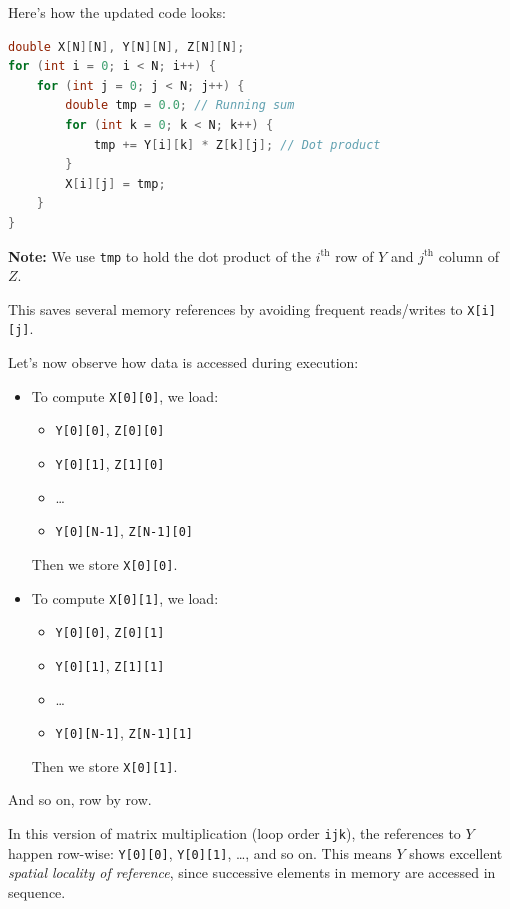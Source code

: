 \documentclass[12pt]{book}
\begin{document}
Here’s how the updated code looks:

\begin{lstlisting}[language=C++, caption={Optimized Matrix Multiplication using temporary variable}, label={lst:opt-matmul}]
double X[N][N], Y[N][N], Z[N][N];
for (int i = 0; i < N; i++) {
    for (int j = 0; j < N; j++) {
        double tmp = 0.0; // Running sum
        for (int k = 0; k < N; k++) {
            tmp += Y[i][k] * Z[k][j]; // Dot product
        }
        X[i][j] = tmp;
    }
}
\end{lstlisting}

\textbf{Note:} We use \texttt{tmp} to hold the dot product of the $i^{\text{th}}$ row of $Y$ and $j^{\text{th}}$ column of $Z$.

This saves several memory references by avoiding frequent reads/writes to \texttt{X[i][j]}.

Let’s now observe how data is accessed during execution:

\begin{itemize}
    \item To compute \texttt{X[0][0]}, we load:
    \begin{itemize}
        \item \texttt{Y[0][0]}, \texttt{Z[0][0]}
        \item \texttt{Y[0][1]}, \texttt{Z[1][0]}
        \item \dots
        \item \texttt{Y[0][N-1]}, \texttt{Z[N-1][0]}
    \end{itemize}
    Then we store \texttt{X[0][0]}.

    \item To compute \texttt{X[0][1]}, we load:
    \begin{itemize}
        \item \texttt{Y[0][0]}, \texttt{Z[0][1]}
        \item \texttt{Y[0][1]}, \texttt{Z[1][1]}
        \item \dots
        \item \texttt{Y[0][N-1]}, \texttt{Z[N-1][1]}
    \end{itemize}
    Then we store \texttt{X[0][1]}.
\end{itemize}

And so on, row by row.

In this version of matrix multiplication (loop order \texttt{ijk}), the references to $Y$ happen row-wise: 
\texttt{Y[0][0]}, \texttt{Y[0][1]}, \dots, and so on. This means $Y$ shows excellent \textit{spatial locality of reference}, since successive elements in memory are accessed in sequence.
\end{document}
